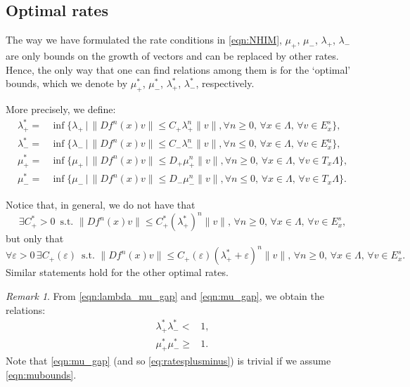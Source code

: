 \documentclass[11pt]{amsart}
\theoremstyle{definition}
\theoremstyle{remark}
\newtheorem{rem}[thm]{Remark}
\numberwithin{equation}{section}
\newcommand{\eps}{\varepsilon}
\begin{document}
\subsection{Optimal rates}
\label{sec:optimalrates}
The way we have formulated the rate conditions in \eqref{eqn:NHIM},
$\mu_+$, $\mu_-$, $\lambda_+$, $\lambda_-$  are only bounds on the growth
of vectors and   can be replaced by other rates.
Hence, the only way that one can find
relations among them is
for the  `optimal'  bounds, which we denote by $\mu_+^*$, $\mu_-^*$, $\lambda_+^*$, $\lambda_-^*$, respectively.

More precisely, we define:
\begin{equation}
\label{eqn:optimal_rates}
\begin{split}
\lambda_+^*=&\inf\{\lambda_+\,|\,\|Df^n(x)v\|\le C_+\lambda_+^n \|v\|,\forall n\geq 0,\,  \forall x\in \Lambda,\, \forall v\in E^s_x\},\\
\lambda_-^*=&\inf\{\lambda_-\,|\,\|Df^n(x)v\|\le C_-\lambda_-^n \|v\|,\forall n\leq 0,\,   \forall x\in \Lambda,\,  \forall v\in E^u_x\},\\
\mu_+^*=&\inf\{\mu_+\,|\,\|Df^n(x)v\|\le D_+\mu_+^n \|v\|,\forall n\geq 0,\,  \forall  x\in \Lambda,\,  \forall v\in T_x\Lambda\},\\
\mu_-^*=&\inf\{\mu_-\,|\,\|Df^n(x)v\|\le D_-\mu_-^n \|v\|,\forall n\leq 0,\,  \forall x\in \Lambda,\,  \forall v\in T_x\Lambda\}.
\end{split}
\end{equation}


Notice that, in general, we do not have that
\[
 \exists C_+^*>0\, \textrm{ s.t. } \|Df^n(x)v\|\le C_+^* (\lambda_+^*)^n\|v\|,\,\forall n\geq 0,\,  \forall x\in \Lambda,\,  \forall  v\in E^s_x ,
 \]
but only that
\[
\forall \eps>0 \,  \exists C_+(\eps) \, \textrm{ s.t. } \|Df^n(x)v\|\le C_+(\eps)(\lambda_+^* + \eps)^n\|v\|, \,\forall n\geq 0,\,  \forall x\in \Lambda,\,   \forall v\in E^s_x .
\]
Similar statements hold for the other optimal rates.

\begin{rem}
From \eqref{eqn:lambda_mu_gap} and \eqref{eqn:mu_gap}, we obtain the relations:
\begin{eqnarray}
\label{eq:lambda_ratesplusminus}
\lambda_+^*\lambda_-^*<& 1,\\
\label{eq:ratesplusminus}
\mu_+^*\mu_-^*\ge& 1 .
\end{eqnarray}
Note that \eqref{eqn:mu_gap} (and so \eqref{eq:ratesplusminus}) is trivial if we assume \eqref{eqn:mubounds}.
\end{rem}
\end{document}
